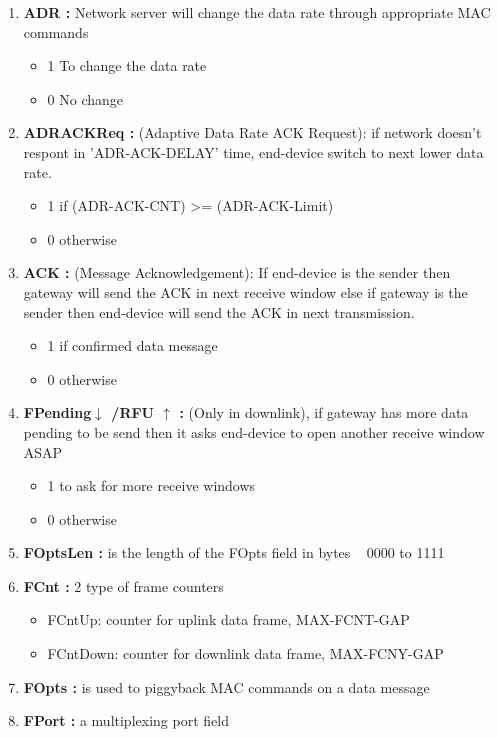 \begin{landscape}
\begin{multicols}{2}
\begin{enumerate}
	\item \textbf{ADR :}  Network server will change the data rate through appropriate MAC commands
	\begin{itemize}
		\item 1  To change the data rate
		\item 0  No change
	\end{itemize}
	\item \textbf{ADRACKReq :} (Adaptive Data Rate ACK Request): if network doesn't respont in 'ADR-ACK-DELAY' time, end-device switch to next lower data rate.
	\begin{itemize}
		\item 1  if (ADR-ACK-CNT) >= (ADR-ACK-Limit)
		\item 0  otherwise
	\end{itemize}
	\item \textbf{ACK :} (Message Acknowledgement): If end-device is the sender then gateway will send the ACK in next receive window  else if gateway is the sender then end-device will send the ACK in next transmission.
	\begin{itemize}
		\item 1  if confirmed data message
		\item 0  otherwise
	\end{itemize}
	\item \textbf{FPending$\downarrow$ /RFU $\uparrow$ :} (Only in downlink), if gateway has more data pending to be send then it asks end-device to open another receive window ASAP
	\begin{itemize}
		\item 1  to ask for more receive windows
		\item 0  otherwise
	\end{itemize}
	\item \textbf{FOptsLen :} is the length of the FOpts field in bytes   0000 to 1111 
	\item \textbf{FCnt :}  2 type of frame counters 
	\begin{itemize}
		\item FCntUp:  counter for uplink data frame, MAX-FCNT-GAP
		\item FCntDown:  counter for downlink data frame, MAX-FCNY-GAP
	\end{itemize}  
	\item \textbf{FOpts :} is used to piggyback MAC commands on a data message	
	\item \textbf{FPort :}  a multiplexing port field
	\begin{itemize}

\end{itemize}
\end{enumerate}
\end{multicols}
\end{landscape}
